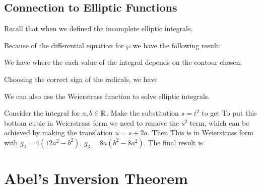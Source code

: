 \documentclass{article}
\begin{document}
\subsection{Connection to Elliptic Functions}

Recall that when we defined the incomplete elliptic integrals,

Because of the differential equation for $\wp$ we have the following result:

\begin{prop}
	We have 
	where the each value of the integral depends on the contour chosen. 
\end{prop}

\begin{example}
	Choosing the correct sign of the radicals, we have 
\end{example}

We can also use the Weierstrass function to solve elliptic integrals.

\begin{example}
	Consider the integral 
	for $a,b \in \mathbb{R}$. Make the substitution $s=t^2$ to get 
	To put this bottom cubic in Weierstrass form we need to remove the $s^2$ term, which can be achieved by making the translation $u = s+2a$. Then 
	This is in Weierstrass form with $g_2 = 4(12a^2-b^2), \, g_3 = 8a(b^2-8a^2)$. The final result is 
	
\end{example}

\section{Abel's Inversion Theorem}
\end{document}
